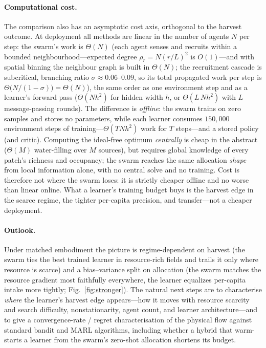 \documentclass{article}
\begin{document}
\paragraph{Computational cost.} The comparison also has an asymptotic cost axis, orthogonal to the harvest
outcome. At deployment all methods are linear in the number of agents $N$ per step: the swarm's work is
$\Theta(N)$ (each agent senses and recruits within a bounded neighbourhood---expected degree $\rho_r=N(r/L)^2$ is
$O(1)$---and with spatial binning the neighbour graph is built in $\Theta(N)$; the recruitment cascade is
subcritical, branching ratio $\sigma\approx0.06$--$0.09$, so its total propagated work per step is
$\Theta\!\big(N/(1-\sigma)\big)=\Theta(N)$), the same order as one environment step and as a learner's forward
pass ($\Theta(N h^2)$ for hidden width $h$, or $\Theta(L\,N h^2)$ with $L$ message-passing rounds). The
difference is \emph{offline}: the swarm trains on zero samples and stores no parameters, while each learner
consumes $150{,}000$ environment steps of training---$\Theta(T N h^2)$ work for $T$ steps---and a stored policy
(and critic). Computing the ideal-free optimum \emph{centrally} is cheap in the abstract ($\Theta(M)$
water-filling over $M$ sources), but requires global knowledge of every patch's richness and occupancy; the
swarm reaches the same allocation \emph{shape} from local information alone, with no central solve and no
training. Cost is therefore not where the swarm loses: it is strictly cheaper offline and no worse than linear
online. What a learner's training budget buys is the harvest edge in the scarce regime, the tighter per-capita
precision, and transfer---not a cheaper deployment.

\paragraph{Outlook.} Under matched embodiment the picture is regime-dependent on harvest (the swarm ties the
best trained learner in resource-rich fields and trails it only where resource is scarce) and a bias--variance
split on allocation (the swarm matches the resource gradient most faithfully everywhere, the learner equalizes
per-capita intake more tightly; Fig.~\ref{fig:stronger}). The natural next steps are to characterise
\emph{where} the learner's harvest edge appears---how it moves with resource scarcity and search difficulty,
nonstationarity, agent count, and learner architecture---and to give a convergence-rate / regret
characterisation of the physical flow against standard bandit and MARL algorithms, including whether a hybrid
that warm-starts a learner from the swarm's zero-shot allocation shortens its budget.
\end{document}
